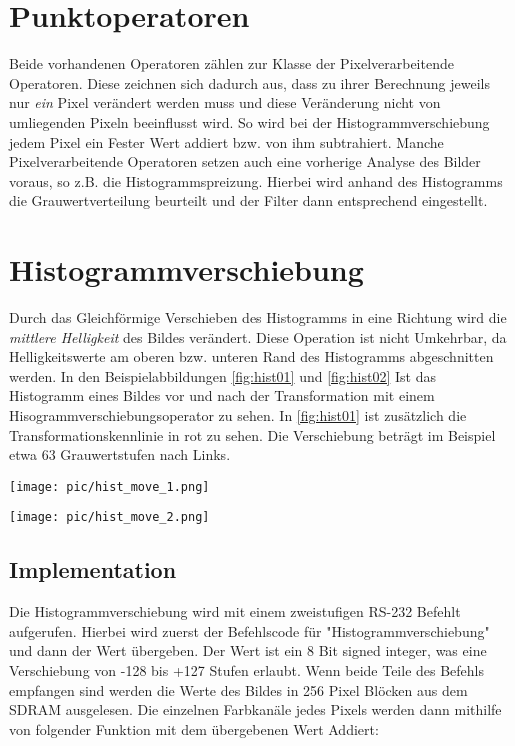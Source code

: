\documentclass[%
  paper=A4, %
  pagesize, %
  12pt,
  ngerman   %
]{scrreprt}  %
\begin{document}
\section{Punktoperatoren}
Beide vorhandenen Operatoren zählen zur Klasse der Pixelverarbeitende Operatoren. Diese zeichnen sich dadurch aus, dass zu ihrer Berechnung jeweils nur \emph{ein} Pixel verändert werden muss und diese Veränderung nicht von umliegenden Pixeln beeinflusst wird. So wird bei der Histogrammverschiebung jedem Pixel ein Fester Wert addiert bzw. von ihm subtrahiert. Manche Pixelverarbeitende Operatoren setzen auch eine vorherige Analyse des Bilder voraus, so z.B. die Histogrammspreizung. Hierbei wird anhand des Histogramms die Grauwertverteilung beurteilt und der Filter dann entsprechend eingestellt.

\section{Histogrammverschiebung}
\label{sec:hist_move}
Durch das Gleichförmige Verschieben des Histogramms in eine Richtung wird die \emph{mittlere Helligkeit} des Bildes verändert. Diese Operation ist nicht Umkehrbar, da Helligkeitswerte am oberen bzw. unteren Rand des Histogramms abgeschnitten werden. In den Beispielabbildungen \ref{fig:hist01} und \ref{fig:hist02} Ist das Histogramm eines Bildes vor und nach der Transformation mit einem Hisogrammverschiebungsoperator zu sehen. In \ref{fig:hist01} ist zusätzlich die Transformationskennlinie in rot zu sehen. Die Verschiebung beträgt im Beispiel etwa 63 Grauwertstufen nach Links.

\noindent\begin{minipage}{.45\textwidth}
  \centering
  \texttt{[image: pic/hist\_move\_1.png]}
  \label{fig:hist01}         
\end{minipage}
\begin{minipage}{.45\textwidth}
  \centering
  \texttt{[image: pic/hist\_move\_2.png]}
  \label{fig:hist02}            
\end{minipage}

\subsection{Implementation}
Die Histogrammverschiebung wird mit einem zweistufigen RS-232 Befehlt aufgerufen. Hierbei wird zuerst der Befehlscode für "Histogrammverschiebung" und dann der Wert übergeben. Der Wert ist ein 8 Bit signed integer, was eine Verschiebung von -128 bis +127 Stufen erlaubt. Wenn beide Teile des Befehls empfangen sind werden die Werte des Bildes in 256 Pixel Blöcken aus dem SDRAM ausgelesen. Die einzelnen Farbkanäle jedes Pixels werden dann mithilfe von folgender Funktion mit dem übergebenen Wert Addiert:\\
\end{document}
